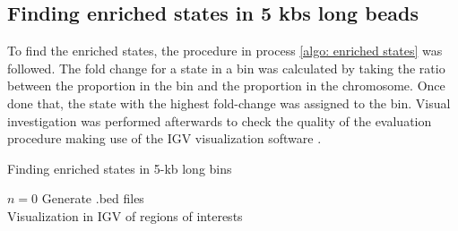 \subsection{Finding enriched states in 5 kbs long beads}

To find the enriched states, the procedure in process \ref{algo: enriched states} was followed. The fold change for a state in a bin was calculated by taking the ratio between the proportion in the bin and the proportion in the chromosome. Once done that, the state with the highest fold-change was assigned to the bin. Visual investigation was performed afterwards to check the quality of the evaluation procedure making use of the IGV visualization software
\cite{robinsonIgvJsEmbeddable2020}.

\begin{algorithm}
    \caption{Finding enriched states in 5-kb long bins}\label{algo: enriched states}
    $n = 0$\;
    Generate .bed files\\
    Visualization in IGV of regions of interests\\
\end{algorithm}


